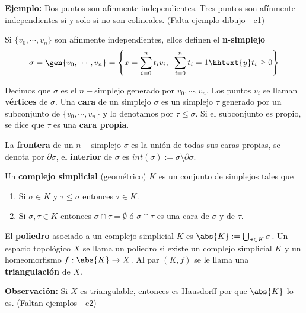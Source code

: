 \documentclass{article}
\begin{document}
\vspace{2mm}
\noindent\textbf{Ejemplo:} Dos puntos son afínmente independientes. Tres puntos son afínmente 
independientes si y solo si no son colineales. (Falta ejemplo dibujo - c1)

\vspace{2mm}
\begin{dfn}
    Si $\{v_{0},\cdots,v_{n}\}$ son afínmente independientes, ellos definen el \textbf{n-simplejo}
    \begin{equation*}
        \sigma=\gen{v_{0},\cdots,v_{n}}=\left\{x=\sum_{i=0}^{n}t_{i}v_{i},\hspace{2mm}
        \sum_{i=0}^{n}t_{i}=1\hhtext{y}t_{i}\geq0\right\}
    \end{equation*}
\end{dfn}

\noindent Decimos que $\sigma$ es el $n-$simplejo generado por $v_{0},\cdots,v_{n}$. Los puntos 
$v_{i}$ se llaman \textbf{vértices} de $\sigma$. Una \textbf{cara} de un simplejo $\sigma$ es 
un simplejo $\tau$ generado por un subconjunto de $\{v_{0},\cdots,v_{n}\}$ y lo denotamos por 
$\tau\leq\sigma$. Si el subconjunto es propio, se dice que $\tau$ es una \textbf{cara propia}.

\vspace{2mm}
\noindent La \textbf{frontera} de un $n-$simplejo $\sigma$ es la unión de todas sus caras propias, 
se denota por $\partial\sigma$, el \textbf{interior} de $\sigma$ es $int(\sigma):=
\sigma\setminus\partial\sigma$.

\vspace{2mm}
\begin{dfn}
    Un \textbf{complejo simplicial} (geométrico) $K$ es un conjunto de simplejos tales que
    \begin{enumerate}
        \item Si $\sigma\in K$ y $\tau\leq\sigma$ entonces $\tau\in K$.
        \item Si $\sigma,\tau\in K$ entonces $\sigma\cap\tau=\emptyset$ ó $\sigma\cap\tau$ es una
        cara de $\sigma$ y de $\tau$.
    \end{enumerate}
\end{dfn}
\noindent El \textbf{poliedro} asociado a un complejo simplicial $K$ es 
$\abs{K}:=\bigcup_{\sigma\in K}\sigma$. Un espacio topológico $X$ se llama un poliedro si existe
un complejo simplicial $K$ y un homeomorfismo $f:\abs{K}\to X$. Al par $(K,f)$ se le llama una 
\textbf{triangulación} de $X$.

\vspace{2mm}
\noindent\textbf{Observación:} Si $X$ es triangulable, entonces es Hausdorff por que $\abs{K}$ 
lo es. (Faltan ejemplos - c2)

\end{document}
